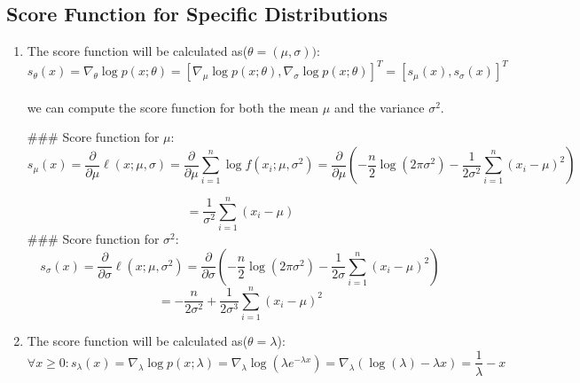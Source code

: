 \documentclass{article}
\begin{document}
\subsection{Score Function for Specific Distributions}
\begin{enumerate}
\item 
The score function will be calculated as($\theta = (\mu,\sigma))$:
\begin{equation*}
    s_\theta (x) = \nabla_\theta \log p(x; \theta) = [\nabla_\mu \log p(x; \theta), \nabla_\sigma \log p(x; \theta)]^T = [s_\mu(x), s_\sigma(x)]^T
\end{equation*}
\\
we can compute the score function for both the mean \( \mu \) and the variance \( \sigma^2 \).


### Score function for \( \mu \):
\[
s_{\mu}(x) = \frac{\partial}{\partial \mu} \ell(x ; \mu, \sigma) = \frac{\partial}{\partial \mu} \sum_{i=1}^{n} \log f(x_i; \mu, \sigma^2) = \frac{\partial}{\partial \mu} \left( -\frac{n}{2} \log(2\pi \sigma^2) - \frac{1}{2\sigma^2} \sum_{i=1}^{n} (x_i - \mu)^2 \right)
\]

\[
= \frac{1}{\sigma^2} \sum_{i=1}^{n} (x_i - \mu)
\]
### Score function for \( \sigma^2 \):
\[
s_{\sigma}(x) = \frac{\partial}{\partial \sigma} \ell(x ; \mu, \sigma^2) = \frac{\partial}{\partial \sigma} \left( -\frac{n}{2} \log(2\pi \sigma^2) - \frac{1}{2\sigma} \sum_{i=1}^{n} (x_i - \mu)^2 \right)
\]
\[
= -\frac{n}{2\sigma^2} + \frac{1}{2\sigma^3} \sum_{i=1}^{n} (x_i - \mu)^2
\]
\item 
The score function will be calculated as($\theta = \lambda$):
\begin{equation*}
    \forall x\geq 0: s_\lambda (x) = \nabla_\lambda \log p(x; \lambda) = \nabla_\lambda \log(\lambda e^{-\lambda x}) =
    \nabla_\lambda (\log(\lambda ) - \lambda x) = \frac{1}{\lambda} - x
\end{equation*}
\end{enumerate}
\end{document}
